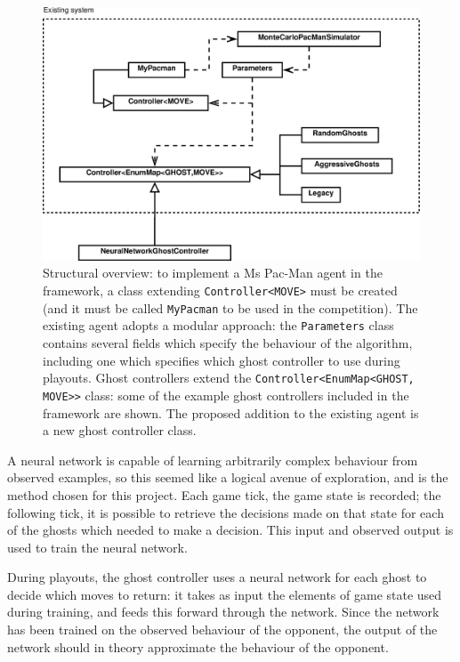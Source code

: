 \begin{figure}
\includegraphics[width=\linewidth]{diagrams/proposed}
\caption[Structural overview]{Structural overview: to implement a Ms Pac-Man agent in the framework, a class extending {\tt Controller<MOVE>} must be created (and it must be called {\tt MyPacman} to be used in the competition).  The existing agent adopts a modular approach: the {\tt Parameters} class contains several fields which specify the behaviour of the algorithm, including one which specifies which ghost controller to use during playouts.  Ghost controllers extend the {\tt Controller<EnumMap<GHOST, MOVE>>} class: some of the example ghost controllers included in the framework are shown.  The proposed addition to the existing agent is a new ghost controller class.}
\label{fig:proposed}
\end{figure}

A neural network is capable of learning arbitrarily complex behaviour from observed examples, so this seemed like a logical avenue of exploration, and is the method chosen for this project.  Each game tick, the game state is recorded; the following tick, it is possible to retrieve the decisions made on that state for each of the ghosts which needed to make a decision.  This input and observed output is used to train the neural network.

During playouts, the ghost controller uses a neural network for each ghost to decide which moves to return: it takes as input the elements of game state used during training, and feeds this forward through the network.  Since the network has been trained on the observed behaviour of the opponent, the output of the network should in theory approximate the behaviour of the opponent.

